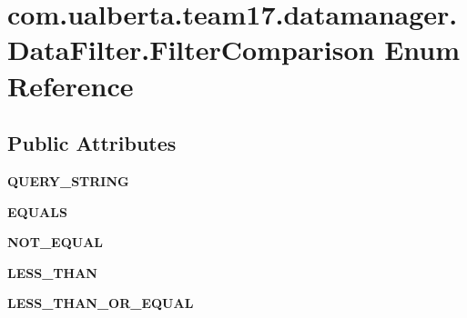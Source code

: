 \hypertarget{enumcom_1_1ualberta_1_1team17_1_1datamanager_1_1_data_filter_1_1_filter_comparison}{\section{com.\+ualberta.\+team17.\+datamanager.\+Data\+Filter.\+Filter\+Comparison Enum Reference}
\label{enumcom_1_1ualberta_1_1team17_1_1datamanager_1_1_data_filter_1_1_filter_comparison}
}
\subsection*{Public Attributes}
\begin{DoxyCompactItemize}
\item 
\hypertarget{enumcom_1_1ualberta_1_1team17_1_1datamanager_1_1_data_filter_1_1_filter_comparison_a2f3fd8ecc4db4d4326d935a446737aa8}{{\bfseries Q\+U\+E\+R\+Y\+\_\+\+S\+T\+R\+I\+N\+G}}\label{enumcom_1_1ualberta_1_1team17_1_1datamanager_1_1_data_filter_1_1_filter_comparison_a2f3fd8ecc4db4d4326d935a446737aa8}

\item 
\hypertarget{enumcom_1_1ualberta_1_1team17_1_1datamanager_1_1_data_filter_1_1_filter_comparison_ad32050a0f12ab4774f6ee862130123af}{{\bfseries E\+Q\+U\+A\+L\+S}}\label{enumcom_1_1ualberta_1_1team17_1_1datamanager_1_1_data_filter_1_1_filter_comparison_ad32050a0f12ab4774f6ee862130123af}

\item 
\hypertarget{enumcom_1_1ualberta_1_1team17_1_1datamanager_1_1_data_filter_1_1_filter_comparison_ab3819209ba7419189f22fad0a95c9607}{{\bfseries N\+O\+T\+\_\+\+E\+Q\+U\+A\+L}}\label{enumcom_1_1ualberta_1_1team17_1_1datamanager_1_1_data_filter_1_1_filter_comparison_ab3819209ba7419189f22fad0a95c9607}

\item 
\hypertarget{enumcom_1_1ualberta_1_1team17_1_1datamanager_1_1_data_filter_1_1_filter_comparison_a6a419da5e2d64146993a9b811378080d}{{\bfseries L\+E\+S\+S\+\_\+\+T\+H\+A\+N}}\label{enumcom_1_1ualberta_1_1team17_1_1datamanager_1_1_data_filter_1_1_filter_comparison_a6a419da5e2d64146993a9b811378080d}

\item 
\hypertarget{enumcom_1_1ualberta_1_1team17_1_1datamanager_1_1_data_filter_1_1_filter_comparison_abf9f0000c7b9ff3ad488329ba6ef66a3}{{\bfseries L\+E\+S\+S\+\_\+\+T\+H\+A\+N\+\_\+\+O\+R\+\_\+\+E\+Q\+U\+A\+L}}\label{enumcom_1_1ualberta_1_1team17_1_1datamanager_1_1_data_filter_1_1_filter_comparison_abf9f0000c7b9ff3ad488329ba6ef66a3}


\end{DoxyCompactItemize}
